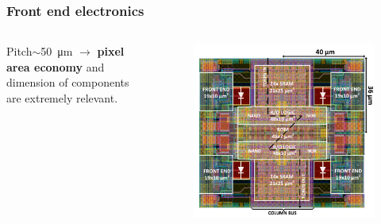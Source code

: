     \begin{frame}[noframenumbering]
        \frametitle{Front end electronics}
            \begin{columns}
                Pitch$\sim$\SI{50}{\um} $\rightarrow$ \textbf{pixel area economy} and dimension of components are extremely relevant. \\\smallskip
                    \begin{figure}[h!]
                        \vspace*{-0.9cm}\hspace*{-0.9cm}
                        \includegraphics[width=1.06\linewidth]{figures/Monopix1/Monopix1_2x2pixelsgroup.png}
                    \end{figure}
            \end{columns}


\end{frame}
